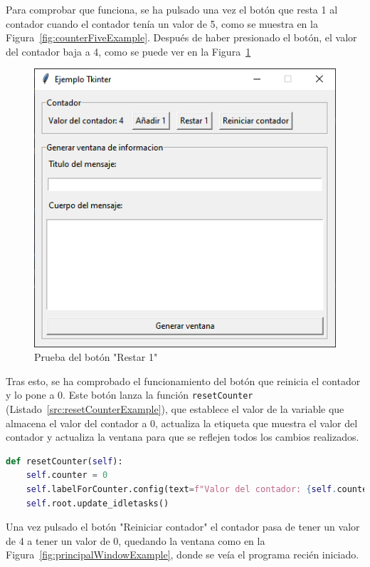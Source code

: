 Para comprobar que funciona, se ha pulsado una vez el botón que resta 1 al contador cuando el contador tenía un valor de 5, como se muestra en la Figura~\ref{fig:counterFiveExample}. Después de haber presionado el botón, el valor del contador baja a 4, como se puede ver en la Figura~\ref{fig:counterFourExample}

\begin{figure}[H]
    \centering
    \includegraphics[width=0.6\linewidth]{fig/Ejemplo Tkinter/contador 4.png}
    \caption{Prueba del botón "Restar 1"}
    \label{fig:counterFourExample}
\end{figure}

Tras esto, se ha comprobado el funcionamiento del botón que reinicia el contador y lo pone a 0. Este botón lanza la función \texttt{resetCounter} (Listado~\ref{src:resetCounterExample}), que establece el valor de la variable que almacena el valor del contador a 0, actualiza la etiqueta que muestra el valor del contador y actualiza la ventana para que se reflejen todos los cambios realizados.

\begin{lstlisting}[language=Python,
                   style=python,
                   frame=none,
                   numbers=none,
                   basicstyle=\ttfamily\normalsize,
                   caption={Función \texttt{resetCounter} del ejemplo de Tkinter},
                   label=src:resetCounterExample,
                   inputencoding=utf8]                   
def resetCounter(self):
    self.counter = 0
    self.labelForCounter.config(text=f"Valor del contador: {self.counter}")
    self.root.update_idletasks()
\end{lstlisting}

Una vez pulsado el botón "Reiniciar contador" el contador pasa de tener un valor de 4 a tener un valor de 0, quedando la ventana como en la Figura~\ref{fig:principalWindowExample}, donde se veía el programa recién iniciado.

